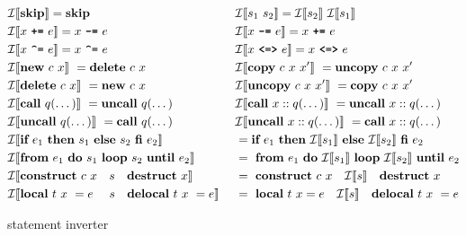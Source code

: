 \begin{figure}[ht]
    \begin{align*}
        &\mathcal{I}\llbracket \textbf{skip} \rrbracket = \textbf{skip} &&\mathcal{I}\llbracket s_1\ s_2 \rrbracket = \mathcal{I}\llbracket s_2 \rrbracket\ \mathcal{I}\llbracket s_1 \rrbracket\\
        &\mathcal{I}\llbracket x\ \texttt{\textbf{+=}}\ e \rrbracket = x\ \texttt{\textbf{-=}}\ e &&\mathcal{I}\llbracket x\ \texttt{\textbf{-=}}\ e \rrbracket = x\ \texttt{\textbf{+=}}\ e\\
        &\mathcal{I}\llbracket x\ \texttt{\textbf{\textasciicircum=}}\ e \rrbracket = x\ \texttt{\textbf{\textasciicircum=}}\ e &&\mathcal{I}\llbracket x\ \texttt{\textbf{<=>}}\ e \rrbracket = x\ \texttt{\textbf{<=>}}\ e\\
        &\mathcal{I} \llbracket \textbf{new}\ c\ x\rrbracket\ = \textbf{delete}\ c\ x  &&\mathcal{I} \llbracket \textbf{copy}\ c\ x\ x' \rrbracket\ = \textbf{uncopy}\ c\ x\ x'\\
        &\mathcal{I} \llbracket \textbf{delete}\ c\ x \rrbracket\ = \textbf{new}\ c\ x  &&\mathcal{I} \llbracket \textbf{uncopy}\ c\ x\ x' \rrbracket\ = \textbf{copy}\ c\ x\ x'\\
        &\mathcal{I} \llbracket \textbf{call}\ q(\dots) \rrbracket\ = \textbf{uncall}\ q(\dots) &&\mathcal{I} \llbracket \textbf{call}\ x::q(\dots) \rrbracket\ = \textbf{uncall}\ x::q(\dots)\\
        &\mathcal{I} \llbracket \textbf{uncall}\ q(\dots) \rrbracket\ = \textbf{call}\ q(\dots) &&\mathcal{I} \llbracket \textbf{uncall}\ x::q(\dots) \rrbracket\ = \textbf{call}\ x::q(\dots)\\
        &\mathcal{I} \llbracket \textbf{if}\ e_1\ \textbf{then}\ s_1\ \textbf{else}\ s_2\ \textbf{fi}\ e_2 \rrbracket &&= \textbf{if}\ e_1\ \textbf{then}\ \mathcal{I}\llbracket s_1 \rrbracket\ \textbf{else}\ \mathcal{I}\llbracket s_2 \rrbracket\ \textbf{fi}\ e_2\\
        &\mathcal{I} \llbracket \textbf{from}\ e_1\ \textbf{do}\ s_1\ \textbf{loop}\ s_2\ \textbf{until}\ e_2 \rrbracket\ &&=\ \textbf{from}\ e_1\ \textbf{do}\ \mathcal{I}\llbracket s_1 \rrbracket\ \textbf{loop}\ \mathcal{I}\llbracket s_2 \rrbracket\ \textbf{until}\ e_2\\
        &\mathcal{I} \llbracket\textbf{construct}\ c\ x\quad s\quad \textbf{destruct}\ x\rrbracket\ &&=\ \textbf{construct}\ c\ x\quad\mathcal{I}\llbracket s \rrbracket\quad\textbf{destruct}\ x\\
        &\mathcal{I} \llbracket\textbf{local}\ t\ x\ = e\ \quad s\quad \textbf{delocal}\ t\ x\ = e\rrbracket\ &&=\ \textbf{local}\ t\ x = e \quad\mathcal{I}\llbracket s \rrbracket\quad\textbf{delocal}\ t\ x\ = e
    \end{align*}
    \caption{\rooplpp statement inverter}
    \label{fig:statement-inverter}
\end{figure}

